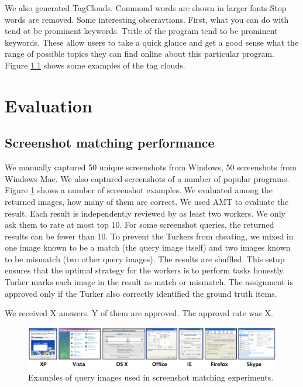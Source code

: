 \documentclass{www2010-submission}
\begin{document}
We also generated TagClouds. Commond words are shown in larger fonts
Stop words are removed. Some interesting obseravtions. First, what you
can do with tend ot be prominent keywords. Ttitle of the program tend
to be prominent keywords. These allow users to take a quick glance and
get a good sense what the range of possible topics they can find
online about this particular program. Figure \ref{} shows some
examples of the tag clouds.

\section{Evaluation}


\subsection{Screenshot matching performance}

We manually captured 50 unique screenshots from Windows, 50
screenshots from Windows Mac. We also captured screenshots of a number
of popular programs. Figure \ref{fig:query_examples} shows a number of
screenshot examples.  We evaluated among the returned images, how many
of them are correct. We used AMT to evaluate the result. Each result
is independently reviewed by as least two workers. We only ask them to
rate at most top 10. For some screenshot queries, the returned results
can be fewer than 10. To prevent the Turkers from cheating, we mixed
in one image known to be a match (the query image itself) and two
images known to be mismatch (two other query images). The results are
shuffled. This setup ensures that the optimal strategy for the workers
is to perform tasks honestly. Turker marks each image in the result as
match or mismatch. The assignment is approved only if the Turker also
correctly identified the ground truth items.

We received X answers. Y of them are approved. The approval rate
was X.

\begin{figure}
\includegraphics[width=2\columnwidth]{figure/query_examples.png}
\caption{Examples of query images used in screenshot matching
experiments.}
\label{fig:query_examples}
\end{figure}
\end{document}
